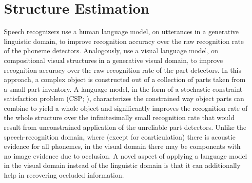 \par\vspace{-1ex}
\section{Structure Estimation}
\label{sec-ll2:structure}

Speech recognizers use a human language model, on utterances in a generative
linguistic domain, to improve recognition accuracy over the raw recognition
rate of the phoneme detectors.
%
Analogously,  use a visual language
model, on compositional visual structures in a generative visual domain, to
improve recognition accuracy over the raw recognition rate of the part
detectors.
%
In this approach, a complex object is constructed out of a collection of parts
taken from a small part inventory.
%
A language model, in the form of a stochastic constraint-satisfaction problem
(CSP; ), characterizes the constrained way object parts can
combine to yield a whole object and significantly improves the recognition rate
of the whole structure over the infinitesimally small recognition rate that
would result from unconstrained application of the unreliable part detectors.
%
Unlike the speech-recognition domain, where (except for coarticulation) there
is acoustic evidence for all phonemes, in the visual domain there may be
components with no image evidence due to occlusion.
%
A novel aspect of applying a language model in the visual domain instead of the
linguistic domain is that it can additionally help in recovering occluded
information.


